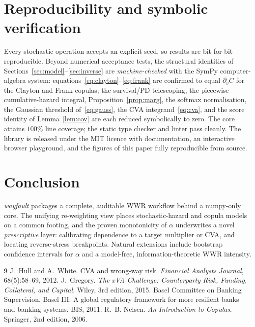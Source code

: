 \documentclass[12pt]{article}
\begin{document}
\section{Reproducibility and symbolic verification}\label{sec:verif}
Every stochastic operation accepts an explicit seed, so results are bit-for-bit
reproducible. Beyond numerical acceptance tests, the structural identities of
Sections~\ref{sec:model}--\ref{sec:inverse} are \emph{machine-checked} with the
SymPy computer-algebra system: equations~\eqref{eq:clayton}--\eqref{eq:frank}
are confirmed to equal $\partial_v C$ for the Clayton and Frank copulas; the
survival/PD telescoping, the piecewise cumulative-hazard integral,
Proposition~\ref{prop:marg}, the softmax normalisation, the Gaussian threshold
of~\eqref{eq:gauss}, the CVA integrand~\eqref{eq:cva}, and the score identity of
Lemma~\ref{lem:cov} are each reduced symbolically to zero. The core attains
$100\%$ line coverage; the static type checker and linter pass cleanly. The
library is released under the MIT licence with documentation, an interactive
browser playground, and the figures of this paper fully reproducible from
source.

\section{Conclusion}
\emph{wayfault} packages a complete, auditable WWR workflow behind a numpy-only
core. The unifying re-weighting view places stochastic-hazard and copula models
on a common footing, and the proven monotonicity of $\alpha$ underwrites a novel
\emph{prescriptive} layer: calibrating dependence to a target multiplier or CVA,
and locating reverse-stress breakpoints. Natural extensions include bootstrap
confidence intervals for $\alpha$ and a model-free, information-theoretic WWR
intensity.

\begin{thebibliography}{9}
J.~Hull and A.~White. CVA and wrong-way risk.
\emph{Financial Analysts Journal}, 68(5):58--69, 2012.
J.~Gregory. \emph{The xVA Challenge: Counterparty Risk, Funding, Collateral,
and Capital}. Wiley, 3rd edition, 2015.
Basel Committee on Banking Supervision. Basel III: A global regulatory framework
for more resilient banks and banking systems. BIS, 2011.
R.~B. Nelsen. \emph{An Introduction to Copulas}. Springer, 2nd edition, 2006.
\end{thebibliography}
\end{document}
